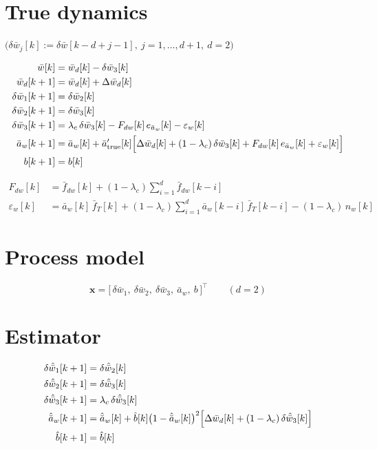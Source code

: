 \documentclass[11pt,a4paper,fontset=none]{ctexart}
\newcommand{\ba}{\bar{a}}
\newcommand{\bw}{\bar{w}}
\begin{document}
\section{True dynamics}

$\bigl(\delta\bw_j[k] := \delta\bw[k-d+j-1],\ j = 1,\dots,d+1,\ d = 2\bigr)$

\begin{align*}
\bw[k]           &= \bw_d[k] - \delta\bw_3[k] \\
\bw_d[k+1]       &= \bw_d[k] + \Delta\bw_d[k] \\
\delta\bw_1[k+1] &= \delta\bw_2[k] \\
\delta\bw_2[k+1] &= \delta\bw_3[k] \\
\delta\bw_3[k+1] &= \lambda_c\,\delta\bw_3[k] - F_{dw}[k]\,e_{\ba_w}[k]
                    - \varepsilon_w[k] \\
\ba_w[k+1]       &= \ba_w[k] + \ba'_{\mathrm{true}}[k]\Bigl[
                    \Delta\bw_d[k] + (1-\lambda_c)\,\delta\bw_3[k]
                    + F_{dw}[k]\,e_{\ba_w}[k] + \varepsilon_w[k]\Bigr] \\
b[k+1]           &= b[k]
\end{align*}

\begin{align*}
F_{dw}[k] &= \bar{f}_{dw}[k] + (1-\lambda_c)\sum_{i=1}^{d}\bar{f}_{dw}[k-i] \\
\varepsilon_w[k] &= \ba_w[k]\,\bar{f}_T[k]
  + (1-\lambda_c)\sum_{i=1}^{d}\ba_w[k-i]\,\bar{f}_T[k-i]
  - (1-\lambda_c)\,n_w[k]
\end{align*}

\section{Process model}

\begin{equation*}
\mathbf{x} = \bigl[\,\delta\bw_1,\ \delta\bw_2,\ \delta\bw_3,\ \ba_w,\ b\,\bigr]^{\top}
\qquad (d = 2)
\end{equation*}

\section{Estimator}

\begin{align*}
\delta\hat{\bw}_1[k+1] &= \delta\hat{\bw}_2[k] \\
\delta\hat{\bw}_2[k+1] &= \delta\hat{\bw}_3[k] \\
\delta\hat{\bw}_3[k+1] &= \lambda_c\,\delta\hat{\bw}_3[k] \\
\hat{\ba}_w[k+1]       &= \hat{\ba}_w[k]
  + \hat{b}[k]\bigl(1-\hat{\ba}_w[k]\bigr)^{2}
    \Bigl[\Delta\bw_d[k] + (1-\lambda_c)\,\delta\hat{\bw}_3[k]\Bigr] \\
\hat{b}[k+1]           &= \hat{b}[k]
\end{align*}
\end{document}
